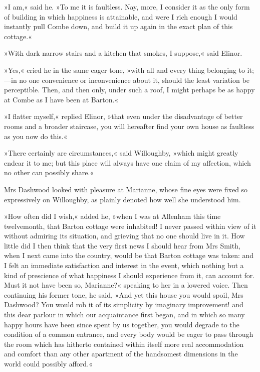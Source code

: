 »I am,« said he. »To me it is faultless. Nay, more, I consider it as the only form of building in which happiness is attainable, and were I rich enough I would instantly pull Combe down, and build it up again in the exact plan of this cottage.«

»With dark narrow stairs and a kitchen that smokes, I suppose,« said Elinor.

»Yes,« cried he in the same eager tone, »with all and every thing belonging to it;—in no one convenience or inconvenience about it, should the least variation be perceptible. Then, and then only, under such a roof, I might perhaps be as happy at Combe as I have been at Barton.«

»I flatter myself,« replied Elinor, »that even under the disadvantage of better rooms and a broader staircase, you will hereafter find your own house as faultless as you now do this.«

»There certainly are circumstances,« said Willoughby, »which might greatly endear it to me; but this place will always have one claim of my affection, which no other can possibly share.«

Mrs Dashwood looked with pleasure at Marianne, whose fine eyes were fixed so expressively on Willoughby, as plainly denoted how well she understood him.

»How often did I wish,« added he, »when I was at Allenham this time twelvemonth, that Barton cottage were inhabited! I never passed within view of it without admiring its situation, and grieving that no one should live in it. How little did I then think that the very first news I should hear from Mrs Smith, when I next came into the country, would be that Barton cottage was taken: and I felt an immediate satisfaction and interest in the event, which nothing but a kind of prescience of what happiness I should experience from it, can account for. Must it not have been so, Marianne?« speaking to her in a lowered voice. Then continuing his former tone, he said, »And yet this house you would spoil, Mrs Dashwood? You would rob it of its simplicity by imaginary improvement! and this dear parlour in which our acquaintance first began, and in which so many happy hours have been since spent by us together, you would degrade to the condition of a common entrance, and every body would be eager to pass through the room which has hitherto contained within itself more real accommodation and comfort than any other apartment of the handsomest dimensions in the world could possibly afford.«

